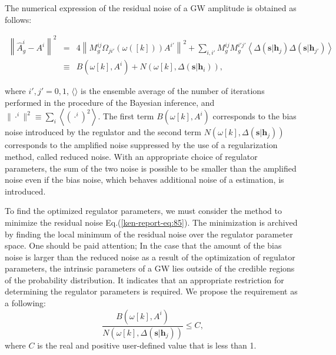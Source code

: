 \documentclass[%
 aps,
 prd,
 amsmath,amssymb,
 reprint,%
superscriptaddress
]{revtex4-1}
\begin{document}
The numerical expression of the residual noise of a GW amplitude is obtained as follows:
\begin{widetext}
 
\begin{eqnarray}
 \left\|\hat{A}_{g}^{i} - A^{i}\right\|^{2} &=& 4\left\|M_{g}^{ij}\Omega_{ji'}(\omega([k]))A^{i'}\right\|^{2} + \sum_{i,i'}M_{g}^{ij}M_{g}^{i'j'}\left\langle\Delta(\bm{s}|\bm{h}_{j})\Delta(\bm{s}|\bm{h}_{j'})\right\rangle\label{ken-report-eq:85}\\
 &\equiv& B(\omega[k], A^{i}) + N(\omega[k], \Delta(\bm{s}|\bm{h}_{i}))\label{ken-short_thesis-eq:3},
\end{eqnarray}
\end{widetext}
where
$i',j'=0,1$,
$\langle\rangle$
is the ensemble average of the number of iterations performed in the procedure of the Bayesian inference, and
$\|\cdot^{i}\|^{2}\equiv \sum_{i}\left\langle(\cdot^{i})^{2}\right\rangle$. The first term
$B(\omega[k], A^{i})$
corresponds to the bias noise introduced by the regulator and the second term
$N(\omega[k], \Delta(\bm{s}|\bm{h}_{j}))$
corresponds to the amplified noise suppressed by the use of a regularization method, called reduced noise. With an appropriate choice of regulator parameters, the sum of the two noise is possible to be smaller than the amplified noise even if the bias noise, which behaves additional noise of a estimation, is introduced.

To find the optimized regulator parameters, we must consider the method to minimize the residual noise Eq.(\ref{ken-report-eq:85}). The minimization is archived by finding the local minimum of the residual noise over the regulator parameter space. One should be paid attention; In the case that the amount of the bias noise is larger than the reduced noise as a result of the optimization of regulator parameters, the intrinsic parameters of a GW lies outside of the credible regions of the probability distribution. It indicates that an appropriate restriction for determining the regulator parameters is required. We propose the requirement as a following:
\begin{equation}\label{ken-thesis-eq:51}
 \frac{B(\omega[k], A^{i})}{N(\omega[k], \Delta(\bm{s}|\bm{h}_{j}))} \leq C,
\end{equation}
where
$C$ is the real and positive user-defined value that is less than 1.
\end{document}
